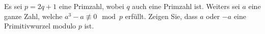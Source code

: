 
\begin{exercise}

Es sei $p = 2q + 1$ eine Primzahl, wobei $q$ auch eine Primzahl ist.
Weiters sei $a$ eine ganze Zahl, welche $a^3 - a \nequiv 0 \mod{p}$ erfüllt.
Zeigen Sie, dass $a$ oder $-a$ eine Primitivwurzel modulo $p$ ist.

\end{exercise}


\begin{solution}

\phantom{}

\end{solution}

